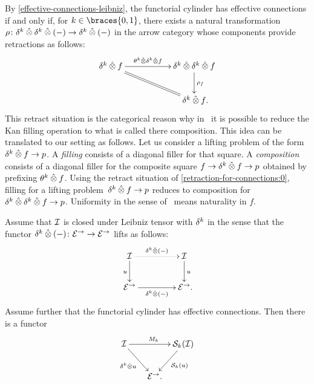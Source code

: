 \documentclass[reqno,10pt,a4paper,oneside,draft]{amsart}
\begin{document}
\begin{remark} \label{retraction-for-connections}
By \cref{effective-connections-leibniz}, the functorial cylinder has effective connections if and only if, for $k \in \braces{0, 1}$, there exists a natural transformation $\rho \co \kcyl \hatotimes \kcyl \hatotimes (-) \to \kcyl \hatotimes (-)$ in the arrow category whose components provide retractions as follows:
\begin{equation} \label{retraction-for-connections:0}
\xymatrix@C+3em{
  \kcyl \hatotimes f
  \ar[r]^-{\thetak \hatotimes \kcyl \hatotimes f}
  \ar@{=}[dr]
&
  \kcyl \hatotimes \kcyl \hatotimes f
  \ar[d]^{\rho_f}
\\&
  \kcyl \hatotimes f
\rlap{.}}
\end{equation}
This retract situation is the categorical reason why in~\cite{cohen-et-al:cubicaltt} 
it is possible to reduce the Kan filling operation to what is called there composition.
This idea can be translated to our setting as follows. Let us consider a lifting problem of the form $\kcyl \hatotimes f \to p$.
A \emph{filling} consists of a diagonal filler for that square.
A \emph{composition} consists of a diagonal filler for the composite square $f \to \kcyl \hatotimes f \to p$ obtained by prefixing $\theta^k \hatotimes f$.
Using the retract situation of \eqref{retraction-for-connections:0}, filling for a lifting 
problem~$\kcyl \hatotimes f \to p$ reduces to composition for~$\kcyl \hatotimes \kcyl \hatotimes f \to p$.
Uniformity in the sense of~\cite{cohen-et-al:cubicaltt} means naturality in $f$.
\end{remark}






\begin{lemma} \label{lem:to-strong-hequiv}
Assume that $\cal{I}$ is closed under Leibniz tensor with $\kcyl$ in the sense that the functor $\kcyl \hatotimes (-) \co \catE^\to \to \catE^\to$ lifts as follows:
\begin{equation}
\label{to-strong-hequiv:0}
\begin{gathered}
\xymatrix@C+2em{
  \cal{I}
  \ar[d]_{u}
  \ar@{.>}[r]^{\kcyl \hatotimes (-)}
&
  \cal{I}
  \ar[d]^{u}
\\
  \catE^\to
  \ar[r]_{\kcyl \hatotimes (-)}
&
  \catE^\to
\rlap{.}}
\end{gathered}
\end{equation}
Assume further that the functorial cylinder has effective connections.
Then there is a functor
\[
\xymatrix@!C@C-2em{
  \cal{I}
  \ar[dr]_{\kcyl \hatotimes u} \ar[rr]^{M_k}
&&
  \cal{S}_k(\cal{I})
  \ar[dl]^{\cal{S}_k(u)}
\\&
   \catE^\to
\rlap{.}}
\]
\end{lemma}
\end{document}
